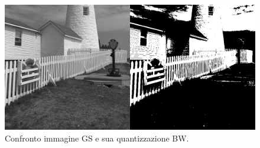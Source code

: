 \documentclass{subfiles}
\begin{document}
\begin{figure}[!h]
    \centering
    \includegraphics[scale = 0.325]{../Images/Lighthouse/LighthouseComparison.png}
    \caption{Confronto immagine GS e sua quantizzazione BW.}
    \label{fig:5.3}
\end{figure}
\end{document}
